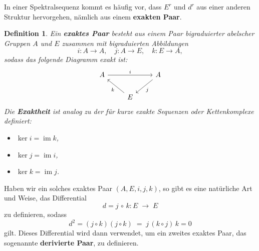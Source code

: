 \documentclass[12pt]{article}
\numberwithin{conj}{section}
\newtheorem{definition}[conj]{Definition}
\newcommand{\ima}{\operatorname{im}}
\begin{document}
    In einer Spektralsequenz kommt es häufig vor, dass $E^{r}$ und $d^{r}$ aus
        einer anderen Struktur hervorgehen, nämlich aus einem \textbf{exakten Paar}.

    \begin{definition}
        Ein \textbf{exaktes Paar} besteht aus einem Paar bigraduierter abelscher Gruppen
        $A$ und $E$ zusammen mit bigraduierten Abbildungen
        \[
            i : A \to A, \quad j : A \to E, \quad k : E \to A,
        \]
        sodass das folgende Diagramm exakt ist:
        \[
            \begin{tikzcd}
                A && A \\ & E \arrow["i", from=1-1, to=1-3] \arrow["j", from=1-3, to=2-2]
                \arrow["k", from=2-2, to=1-1]
            \end{tikzcd}
        \]
        Die \textbf{Exaktheit} ist analog zu der für kurze exakte Sequenzen oder Kettenkomplexe
        definiert:
        \begin{itemize}[nolistsep]
            \item $\ker i = \ima k$,

            \item $\ker j = \ima i$,

            \item $\ker k = \ima j$.
        \end{itemize}
    \end{definition}

    Haben wir ein solches exaktes Paar $(A,E,i,j,k)$, so gibt es eine natürliche
    Art und Weise, das Differential
    \[
        d = j \,\circ\, k : E \;\longrightarrow\; E
    \]
    zu definieren, sodass
    \[
        d^{2} = (j \circ k)(j \circ k) \;=\; j\,(k \circ j)\,k = 0
    \]
    gilt. Dieses Differential wird dann verwendet, um ein zweites exaktes Paar, das
    sogenannte \textbf{derivierte Paar}, zu definieren.
\end{document}
